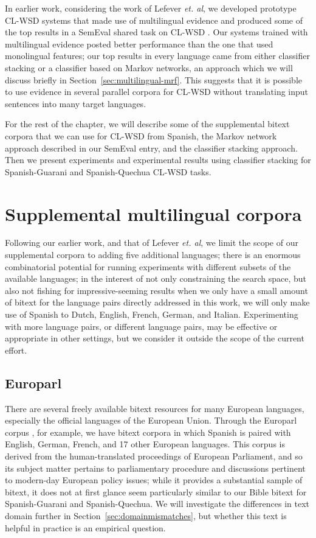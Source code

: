 In earlier work, considering the work of Lefever \emph{et. al}, we developed
prototype CL-WSD systems that made use of multilingual evidence
\cite{rudnick-liu-gasser:2013:SemEval-2013} and produced some of the top
results in a SemEval shared task on CL-WSD \cite{task10}.
Our systems trained with multilingual evidence posted better performance than
the one that used monolingual features; our top results in every language came
from either classifier stacking or a classifier based on Markov networks,
an approach which we will discuss briefly in
Section~\ref{sec:multilingual-mrf}. This suggests that it is possible to use
evidence in several parallel corpora for CL-WSD without translating input
sentences into many target languages.

For the rest of the chapter, we will describe some of the supplemental bitext
corpora that we can use for CL-WSD from Spanish, the Markov network approach
described in our SemEval entry, and the classifier stacking approach. Then we
present experiments and experimental results using classifier stacking for
Spanish-Guarani and Spanish-Quechua CL-WSD tasks.

\section{Supplemental multilingual corpora} 

Following our earlier work, and that of Lefever \emph{et. al}, we limit the
scope of our supplemental corpora to adding five additional languages; there is
an enormous combinatorial potential for running experiments with different
subsets of the available languages; in the interest of not only constraining
the search space, but also not fishing for impressive-seeming results when we
only have a small amount of bitext for the language pairs directly addressed in
this work, we will only make use of Spanish to Dutch, English, French, German,
and Italian. Experimenting with more language pairs, or different language
pairs, may be effective or appropriate in other settings, but we consider it
outside the scope of the current effort.

\subsection{Europarl}
There are several freely available bitext resources for many European
languages, especially the official languages of the European Union. Through the
Europarl corpus \cite{europarl}, for example, we have bitext corpora in which
Spanish is paired with English, German, French, and 17 other European
languages. This corpus is derived from the human-translated proceedings of
European Parliament, and so its subject matter pertains to parliamentary
procedure and discussions pertinent to modern-day European policy issues; while
it provides a substantial sample of bitext, it does not at first glance seem
particularly similar to our Bible bitext for Spanish-Guarani and
Spanish-Quechua. We will investigate the differences in text domain further in
Section~\ref{sec:domainmismatches}, but whether this text is helpful in
practice is an empirical question.

